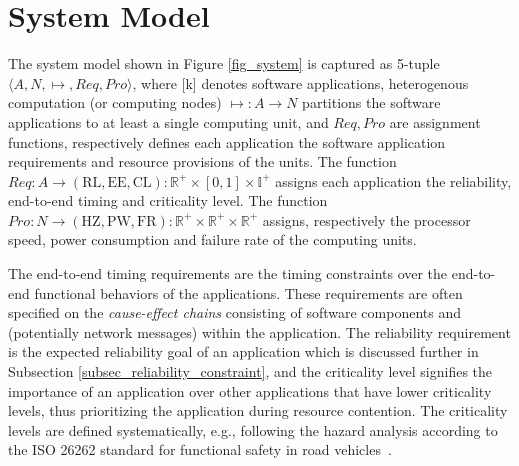 \section{System Model}\label{sec_system}
The system model shown in Figure \ref{fig_system} is captured as 5-tuple $\langle A,N,\mapsto,Req,Pro\rangle$, where [k] denotes software applications,   heterogenous computation (or computing nodes) $\mapsto: A\rightarrow N$ partitions the software applications to at least a single computing unit, and $Req, Pro$ are assignment functions, respectively defines each application the software application requirements and resource provisions of the units. The  function $Req:A\rightarrow (\mathrm{RL,EE,CL}):\mathbb{R}^+\times [0,1]\times \mathbb{I}^+$ assigns each application the reliability, end-to-end timing and criticality level. The function $Pro:N\rightarrow (\mathrm{HZ,PW,FR}):\mathbb{R}^+\times \mathbb{R}^+\times \mathbb{R}^+$ assigns, respectively the processor speed, power consumption and failure rate of the computing units. 

The end-to-end timing requirements are the timing constraints over the end-to-end functional behaviors of the applications. These requirements are often specified on the \textit{cause-effect chains} consisting of software components and (potentially network messages) within the application. The reliability requirement is the expected reliability goal of an application which is discussed further in Subsection \ref{subsec_reliability_constraint}, and the criticality level signifies the importance of an application over other applications that have lower criticality levels, thus prioritizing the application during resource contention. The criticality levels are defined systematically, e.g., following the hazard analysis according to the ISO 26262 standard for functional safety in road vehicles~\cite{iso201126262}. 

